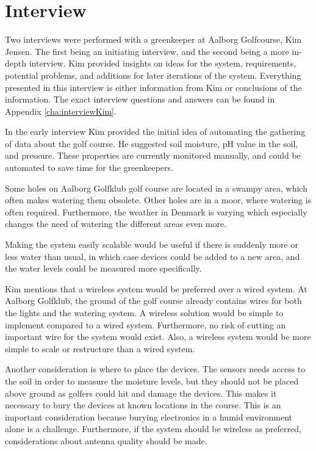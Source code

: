 \section{Interview}
Two interviews were performed with a greenkeeper at Aalborg Golfcourse, Kim Jensen. The first being an initiating interview, and the second being a more in-depth interview. Kim provided insights on ideas for the system, requirements, potential problems, and additions for later iterations of the system. Everything presented in this interview is either information from Kim or conclusions of the information. The exact interview questions and answers can be found in Appendix \ref{cha:interviewKim}. 

In the early interview Kim provided the initial idea of automating the gathering of data about the golf course. He suggested soil moisture, pH value in the soil, and pressure. These properties are currently monitored manually, and could be automated to save time for the greenkeepers.

Some holes on Aalborg Golfklub golf course are located in a swampy area, which often makes watering them obsolete. Other holes are in a moor, where watering is often required. Furthermore, the weather in Denmark is varying which especially changes the need of watering the different areas even more. 

Making the system easily scalable would be useful if there is suddenly more or less water than usual, in which case devices could be added to a new area, and the water levels could be measured more specifically.

Kim mentions that a wireless system would be preferred over a wired system. At Aalborg Golfklub, the ground of the golf course already contains wires for both the lights and the watering system. A wireless solution would be simple to implement compared to a wired system. Furthermore, no risk of cutting an important wire for the system would exist. Also, a wireless system would be more simple to scale or restructure than a wired system.

Another consideration is where to place the devices. The sensors needs access to the soil in order to measure the moisture levels, but they should not be placed above ground as golfers could hit and damage the devices. This makes it necessary to bury the devices at known locations in the course. This is an important consideration because burying electronics in a humid environment alone is a challenge. Furthermore, if the system should be wireless as preferred, considerations about antenna quality should be made.

